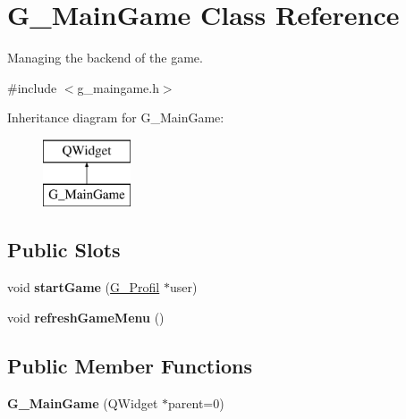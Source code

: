 \hypertarget{class_g___main_game}{}\section{G\+\_\+\+Main\+Game Class Reference}
\label{class_g___main_game}


Managing the backend of the game.  




{\ttfamily \#include $<$g\+\_\+maingame.\+h$>$}

Inheritance diagram for G\+\_\+\+Main\+Game\+:\begin{figure}[H]
\begin{center}
\leavevmode
\includegraphics[height=2.000000cm]{class_g___main_game}
\end{center}
\end{figure}
\subsection*{Public Slots}
\begin{DoxyCompactItemize}
\item 
\hypertarget{class_g___main_game_aaa438c63b4e0f9696ab39edd65748d67}{}void {\bfseries start\+Game} (\hyperlink{class_g___profil}{G\+\_\+\+Profil} $\ast$user)\label{class_g___main_game_aaa438c63b4e0f9696ab39edd65748d67}

\item 
\hypertarget{class_g___main_game_affeaf42be6e712423483c31b01ebb0a8}{}void {\bfseries refresh\+Game\+Menu} ()\label{class_g___main_game_affeaf42be6e712423483c31b01ebb0a8}

\end{DoxyCompactItemize}
\subsection*{Public Member Functions}
\begin{DoxyCompactItemize}
\item 
\hypertarget{class_g___main_game_a6fd96da20870aaac75975e435b80d1ae}{}{\bfseries G\+\_\+\+Main\+Game} (Q\+Widget $\ast$parent=0)\label{class_g___main_game_a6fd96da20870aaac75975e435b80d1ae}

\end{DoxyCompactItemize}


